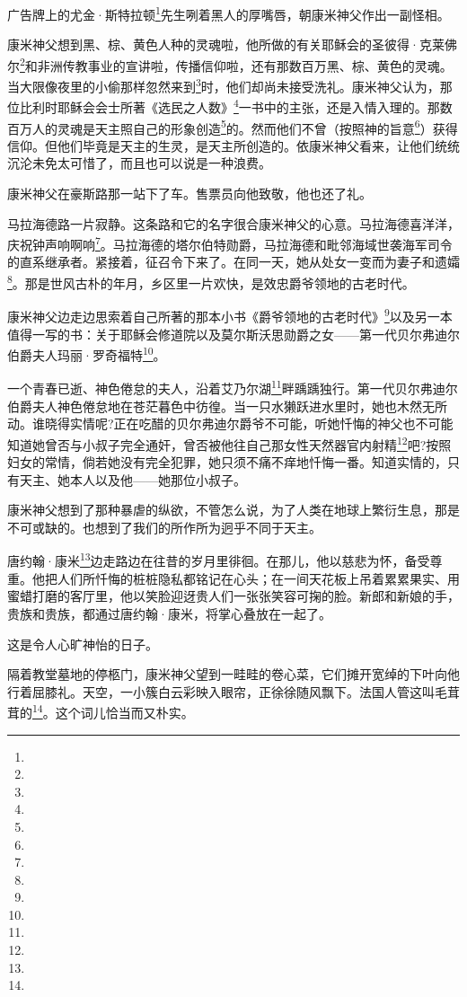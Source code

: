 \par 广告牌上的尤金·斯特拉顿\footnote{}先生咧着黑人的厚嘴唇，朝康米神父作出一副怪相。
\par 康米神父想到黑、棕、黄色人种的灵魂啦，他所做的有关耶稣会的圣彼得·克莱佛尔\footnote{}和非洲传教事业的宣讲啦，传播信仰啦，还有那数百万黑、棕、黄色的灵魂。当大限像夜里的小偷那样忽然来到\footnote{}时，他们却尚未接受洗礼。康米神父认为，那位比利时耶稣会会士所著《选民之人数》\footnote{}一书中的主张，还是入情入理的。那数百万人的灵魂是天主照自己的形象创造\footnote{}的。然而他们不曾（按照神的旨意\footnote{}）获得信仰。但他们毕竟是天主的生灵，是天主所创造的。依康米神父看来，让他们统统沉沦未免太可惜了，而且也可以说是一种浪费。
\par 康米神父在豪斯路那一站下了车。售票员向他致敬，他也还了礼。
\par 马拉海德路一片寂静。这条路和它的名字很合康米神父的心意。马拉海德喜洋洋，庆祝钟声响啊响\footnote{}。马拉海德的塔尔伯特勋爵，马拉海德和毗邻海域世袭海军司令的直系继承者。紧接着，征召令下来了。在同一天，她从处女一变而为妻子和遗孀\footnote{}。那是世风古朴的年月，乡区里一片欢快，是效忠爵爷领地的古老时代。
\par 康米神父边走边思索着自己所著的那本小书《爵爷领地的古老时代》\footnote{}以及另一本值得一写的书：关于耶稣会修道院以及莫尔斯沃思勋爵之女——第一代贝尔弗迪尔伯爵夫人玛丽·罗奇福特\footnote{}。
\par 一个青春已逝、神色倦怠的夫人，沿着艾乃尔湖\footnote{}畔踽踽独行。第一代贝尔弗迪尔伯爵夫人神色倦怠地在苍茫暮色中彷徨。当一只水獭跃进水里时，她也木然无所动。谁晓得实情呢?正在吃醋的贝尔弗迪尔爵爷不可能，听她忏悔的神父也不可能知道她曾否与小叔子完全通奸，曾否被他往自己那女性天然器官内射精\footnote{}吧?按照妇女的常情，倘若她没有完全犯罪，她只须不痛不痒地忏悔一番。知道实情的，只有天主、她本人以及他——她那位小叔子。
\par 康米神父想到了那种暴虐的纵欲，不管怎么说，为了人类在地球上繁衍生息，那是不可或缺的。也想到了我们的所作所为迥乎不同于天主。
\par 唐约翰·康米\footnote{}边走路边在往昔的岁月里徘徊。在那儿，他以慈悲为怀，备受尊重。他把人们所忏悔的桩桩隐私都铭记在心头；在一间天花板上吊着累累果实、用蜜蜡打磨的客厅里，他以笑脸迎迓贵人们一张张笑容可掬的脸。新郎和新娘的手，贵族和贵族，都通过唐约翰·康米，将掌心叠放在一起了。
\par 这是令人心旷神怡的日子。
\par 隔着教堂墓地的停柩门，康米神父望到一畦畦的卷心菜，它们摊开宽绰的下叶向他行着屈膝礼。天空，一小簇白云彩映入眼帘，正徐徐随风飘下。法国人管这叫毛茸茸的\footnote{}。这个词儿恰当而又朴实。
